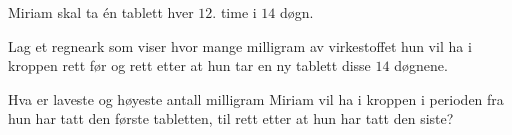 Miriam skal ta én tablett hver $12$. time i $14$ døgn.

\begin{oppgaver}
   Lag et regneark som viser hvor mange milligram av virkestoffet hun
    vil ha i kroppen rett før og rett etter at hun tar en ny tablett disse $14$
    døgnene.
\end{oppgaver}

\begin{oppgaver}
   Hva er laveste og høyeste antall milligram Miriam vil ha i kroppen i
    perioden fra hun har tatt den første tabletten, til rett etter at hun har
    tatt den siste?
\end{oppgaver}
